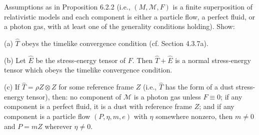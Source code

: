 Assumptions as in Proposition 6.2.2 (i.e., $(M, \mathcal{M}, F)$ is a finite superposition of relativistic models and each component is either a particle flow, a perfect fluid, or a photon gas, with at least one of the generality conditions holding). Show:

(a) $\hat{T}$ obeys the timelike convergence condition (cf. Section 4.3.7a).

(b) Let $\hat{E}$ be the stress-energy tensor of $F$. Then $\hat{T} + \hat{E}$ is a normal stress-energy tensor which obeys the timelike convergence condition.

(c) If $\hat{T} = \rho Z \otimes Z$ for some reference frame $Z$ (i.e., $\hat{T}$ has the form of a dust stress-energy tensor), then: no component of $\mathcal{M}$ is a photon gas unless $F \equiv 0$; if any component is a perfect fluid, it is a dust with reference frame $Z$; and if any component is a particle flow $(P, \eta, m, e)$ with $\eta$ somewhere nonzero, then $m \neq 0$ and $P = mZ$ wherever $\eta \neq 0$.
